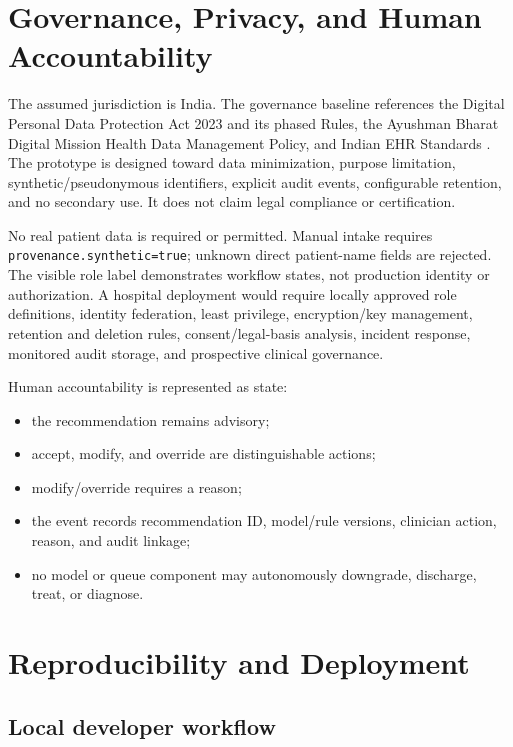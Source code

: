 \documentclass[11pt,a4paper]{article}
\newcommand{\code}[1]{\nolinkurl{#1}}
\begin{document}
\section{Governance, Privacy, and Human Accountability}

The assumed jurisdiction is India. The governance baseline references the Digital Personal Data Protection Act 2023 and its phased Rules, the Ayushman Bharat Digital Mission Health Data Management Policy, and Indian EHR Standards \cite{dpdp,dpdprules,abdm,ehrindia}. The prototype is designed toward data minimization, purpose limitation, synthetic/pseudonymous identifiers, explicit audit events, configurable retention, and no secondary use. It does not claim legal compliance or certification.

No real patient data is required or permitted. Manual intake requires \code{provenance.synthetic=true}; unknown direct patient-name fields are rejected. The visible role label demonstrates workflow states, not production identity or authorization. A hospital deployment would require locally approved role definitions, identity federation, least privilege, encryption/key management, retention and deletion rules, consent/legal-basis analysis, incident response, monitored audit storage, and prospective clinical governance.

Human accountability is represented as state:

\begin{itemize}
  \item the recommendation remains advisory;
  \item accept, modify, and override are distinguishable actions;
  \item modify/override requires a reason;
  \item the event records recommendation ID, model/rule versions, clinician action, reason, and audit linkage;
  \item no model or queue component may autonomously downgrade, discharge, treat, or diagnose.
\end{itemize}

\section{Reproducibility and Deployment}

\subsection{Local developer workflow}
\end{document}
